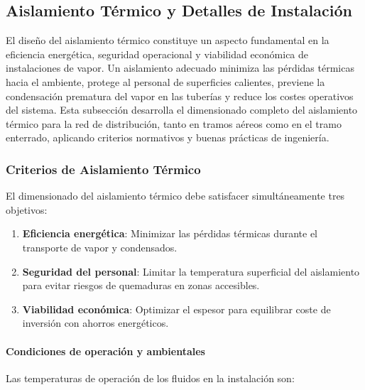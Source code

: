 \documentclass[12pt]{article}
\begin{document}

\subsection{Aislamiento Térmico y Detalles de Instalación}
\label{subsec:aislamiento_termico}

El diseño del aislamiento térmico constituye un aspecto fundamental en la eficiencia energética, seguridad operacional y viabilidad económica de instalaciones de vapor. Un aislamiento adecuado minimiza las pérdidas térmicas hacia el ambiente, protege al personal de superficies calientes, previene la condensación prematura del vapor en las tuberías y reduce los costes operativos del sistema. Esta subsección desarrolla el dimensionado completo del aislamiento térmico para la red de distribución, tanto en tramos aéreos como en el tramo enterrado, aplicando criterios normativos y buenas prácticas de ingeniería.


\subsubsection{Criterios de Aislamiento Térmico}
\label{subsubsec:criterios_aislamiento}

El dimensionado del aislamiento térmico debe satisfacer simultáneamente tres objetivos:

\begin{enumerate}[noitemsep]
	\item \textbf{Eficiencia energética}: Minimizar las pérdidas térmicas durante el transporte de vapor y condensados.
	\item \textbf{Seguridad del personal}: Limitar la temperatura superficial del aislamiento para evitar riesgos de quemaduras en zonas accesibles.
	\item \textbf{Viabilidad económica}: Optimizar el espesor para equilibrar coste de inversión con ahorros energéticos.
\end{enumerate}

\paragraph{Condiciones de operación y ambientales}
\label{par:condiciones_operacion_aisl}

Las temperaturas de operación de los fluidos en la instalación son:
\end{document}
